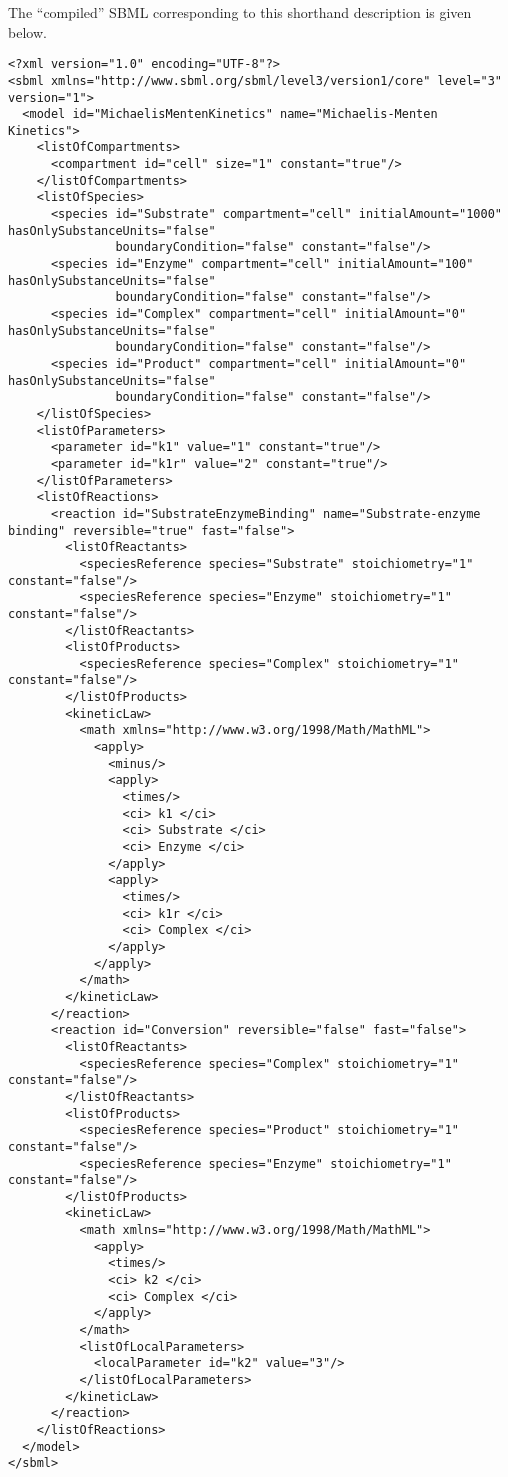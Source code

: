 \documentclass[11pt,a4paper]{article}
\begin{document}
\noindent The ``compiled'' SBML corresponding to this shorthand description is
given below.

{\scriptsize
\begin{verbatim}
<?xml version="1.0" encoding="UTF-8"?>
<sbml xmlns="http://www.sbml.org/sbml/level3/version1/core" level="3" version="1">
  <model id="MichaelisMentenKinetics" name="Michaelis-Menten Kinetics">
    <listOfCompartments>
      <compartment id="cell" size="1" constant="true"/>
    </listOfCompartments>
    <listOfSpecies>
      <species id="Substrate" compartment="cell" initialAmount="1000" hasOnlySubstanceUnits="false"
               boundaryCondition="false" constant="false"/>
      <species id="Enzyme" compartment="cell" initialAmount="100" hasOnlySubstanceUnits="false" 
               boundaryCondition="false" constant="false"/>
      <species id="Complex" compartment="cell" initialAmount="0" hasOnlySubstanceUnits="false" 
               boundaryCondition="false" constant="false"/>
      <species id="Product" compartment="cell" initialAmount="0" hasOnlySubstanceUnits="false"
               boundaryCondition="false" constant="false"/>
    </listOfSpecies>
    <listOfParameters>
      <parameter id="k1" value="1" constant="true"/>
      <parameter id="k1r" value="2" constant="true"/>
    </listOfParameters>
    <listOfReactions>
      <reaction id="SubstrateEnzymeBinding" name="Substrate-enzyme binding" reversible="true" fast="false">
        <listOfReactants>
          <speciesReference species="Substrate" stoichiometry="1" constant="false"/>
          <speciesReference species="Enzyme" stoichiometry="1" constant="false"/>
        </listOfReactants>
        <listOfProducts>
          <speciesReference species="Complex" stoichiometry="1" constant="false"/>
        </listOfProducts>
        <kineticLaw>
          <math xmlns="http://www.w3.org/1998/Math/MathML">
            <apply>
              <minus/>
              <apply>
                <times/>
                <ci> k1 </ci>
                <ci> Substrate </ci>
                <ci> Enzyme </ci>
              </apply>
              <apply>
                <times/>
                <ci> k1r </ci>
                <ci> Complex </ci>
              </apply>
            </apply>
          </math>
        </kineticLaw>
      </reaction>
      <reaction id="Conversion" reversible="false" fast="false">
        <listOfReactants>
          <speciesReference species="Complex" stoichiometry="1" constant="false"/>
        </listOfReactants>
        <listOfProducts>
          <speciesReference species="Product" stoichiometry="1" constant="false"/>
          <speciesReference species="Enzyme" stoichiometry="1" constant="false"/>
        </listOfProducts>
        <kineticLaw>
          <math xmlns="http://www.w3.org/1998/Math/MathML">
            <apply>
              <times/>
              <ci> k2 </ci>
              <ci> Complex </ci>
            </apply>
          </math>
          <listOfLocalParameters>
            <localParameter id="k2" value="3"/>
          </listOfLocalParameters>
        </kineticLaw>
      </reaction>
    </listOfReactions>
  </model>
</sbml>
\end{verbatim}}
\end{document}
